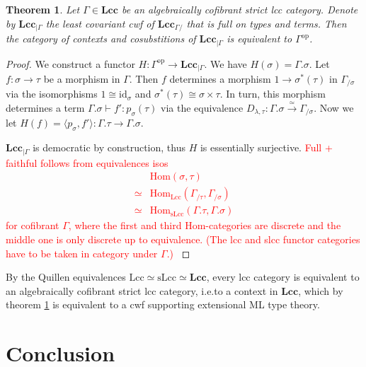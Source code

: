 \documentclass{article}
\newcommand{\todo}[1]{\textcolor{red}{#1}}
\newtheorem{theorem}{Theorem}
\theoremstyle{remark}
\theoremstyle{definition}
\begin{document}
\begin{theorem}
  \label{th:context-as-model}
  Let $\Gamma \in \mathbf{Lcc}$ be an algebraically cofibrant strict lcc category.
  Denote by $\mathbf{Lcc}_{| \Gamma}$ the least covariant cwf of $\mathbf{Lcc}_{\Gamma /}$ that is full on types and terms.
  Then the category of contexts and cosubstitions of $\mathbf{Lcc}_{| \Gamma}$ is equivalent to $\Gamma^\mathrm{op}$.
\end{theorem}
\begin{proof}
  We construct a functor $H : \Gamma^\mathrm{op} \rightarrow \mathbf{Lcc}_{| \Gamma}$.
  We have $H(\sigma) = \Gamma.\sigma$.
  Let $f : \sigma \rightarrow \tau$ be a morphism in $\Gamma$.
  Then $f$ determines a morphism $1 \rightarrow \sigma^*(\tau)$ in $\Gamma_{/ \sigma}$ via the isomorphisms $1 \cong \mathrm{id}_\sigma$ and $\sigma^*(\tau) \cong \sigma \times \tau$.
  In turn, this morphism determines a term $\Gamma.\sigma \vdash f' : p_\sigma(\tau)$ via the equivalence $D_{\lambda, \tau} : \Gamma.\sigma \xrightarrow{\simeq} \Gamma_{/ \sigma}$.
  Now we let $H(f) = \langle p_\sigma, f' \rangle : \Gamma.\tau \rightarrow \Gamma.\sigma$.
  
  $\mathbf{Lcc}_{| \Gamma}$ is democratic by construction, thus $H$ is essentially surjective.
  \todo{
    Full + faithful follows from equivalences isos
    \begin{align}
      & \mathrm{Hom}(\sigma, \tau) \\
      \simeq {} & \mathrm{Hom}_\mathrm{Lcc}(\Gamma_{/ \tau} , \Gamma_{/ \sigma}) \\
      \simeq {} & \mathrm{Hom}_\mathrm{sLcc}(\Gamma.\tau, \Gamma.\sigma)
    \end{align}
    for cofibrant $\Gamma$, where the first and third Hom-categories are discrete and the middle one is only discrete up to equivalence.
    (The lcc and slcc functor categories have to be taken in category under $\Gamma$.)
  }
\end{proof}

By the Quillen equivalences $\mathrm{Lcc} \simeq \mathrm{sLcc} \simeq \mathbf{Lcc}$, every lcc category is equivalent to an algebraically cofibrant strict lcc category, i.e.\@ to a context in $\mathbf{Lcc}$, which by theorem \ref{th:context-as-model} is equivalent to a cwf supporting extensional ML type theory.

\section{Conclusion}
\end{document}
